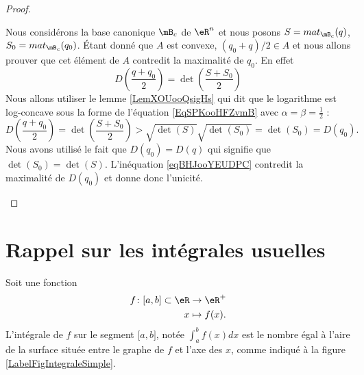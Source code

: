 \begin{proof}
\begin{subproof}
            Nous considérons la base canonique \( \mB_c\) de \( \eR^n\) et nous posons \( S=mat_{\mB_c}(q)\), \( S_0=mat_{\mB_c}(q_0)\). Étant donné que \( A\) est convexe, \( (q_0+q)/2\in A\) et nous allons prouver que cet élément de \( A\) contredit la maximalité de \( q_0\). En effet
            \begin{equation}
                D\left( \frac{ q+q_0 }{ 2 }\right)=\det\left( \frac{ S+S_0 }{2} \right)
            \end{equation}
            Nous allons utiliser le lemme \ref{LemXOUooQsigHs} qui dit que le logarithme est log-concave sous la forme de l'équation \eqref{EqSPKooHFZvmB} avec \( \alpha=\beta=\frac{ 1 }{2}\) :
            \begin{equation}    \label{eqBHJooYEUDPC}
                D\left( \frac{ q+q_0 }{ 2 }\right)=\det\left( \frac{ S+S_0 }{2} \right)>\sqrt{\det(S)}\sqrt{\det(S_0)}=\det(S_0)=D(q_0).
            \end{equation}
            Nous avons utilisé le fait que \( D(q_0)=D(q)\) qui signifie que \( \det(S_0)=\det(S)\). L'inéquation \eqref{eqBHJooYEUDPC} contredit la maximalité de \( D(q_0)\) et donne donc l'unicité.
    \end{subproof}
\end{proof}

\section{Rappel sur les intégrales usuelles}


Soit une fonction
\begin{equation}
    \begin{aligned}
        f\colon \mathopen[ a , b \mathclose]\subset\eR&\to \eR^+ \\
        x&\mapsto f(x) .
    \end{aligned}
\end{equation}
L'intégrale de $f$ sur le segment $\mathopen[ a , b \mathclose]$, notée $\int_a^bf(x)dx$ est le nombre égal à l'aire de la surface située entre le graphe de $f$ et l'axe des $x$, comme indiqué à la figure \ref{LabelFigIntegraleSimple}.
\newcommand{\CaptionFigIntegraleSimple}{L'intégrale de $f$ entre $a$ et $b$ représente la surface sous la fonction.}


